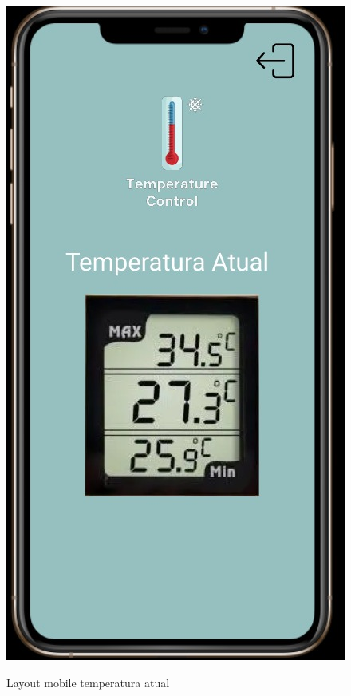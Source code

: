     \begin{figure}[ht]
        \caption{Layout mobile temperatura atual}
        \centering
        \includegraphics[scale=0.5]{img/mobile/temp_atual.jpeg}
        \label{fig:mobileTempAtual}
    \end{figure}

